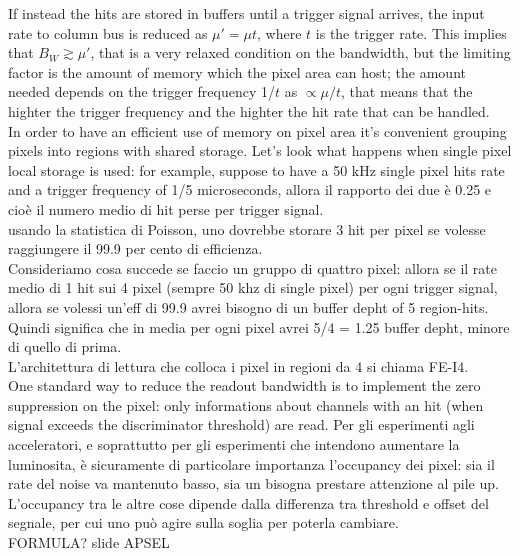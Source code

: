    If instead the hits are stored in buffers until a trigger signal arrives, the input rate
   to column bus is reduced as $\mu'=\mu t$, where $t$ is the trigger rate.
   This implies that $B_{W} \gtrsim \mu'$, that is a very relaxed condition on the
   bandwidth, but the limiting factor is the amount of memory  which the pixel area
   can host; the amount needed depends on the trigger frequency 1/$t$ as
   $\propto\mu/t$, that means that the highter the trigger frequency and the highter
   the hit rate that can be handled. \\
   In order to have an efficient use of memory on pixel area it's convenient
   grouping pixels into regions with shared storage. Let's look what happens when
   single pixel local storage is used: for example, suppose to have a 50 kHz single
   pixel hits rate and a trigger frequency of 1/5 microseconds, allora il rapporto dei due
   è 0.25 e cioè il numero medio di hit perse per trigger signal.\\
   usando la statistica di Poisson, uno dovrebbe storare 3 hit per pixel se volesse
   raggiungere il 99.9 per cento di efficienza.\\
   Consideriamo cosa succede se faccio un gruppo di quattro pixel: allora se il rate
   medio di 1 hit sui 4 pixel (sempre 50 khz di single pixel) per ogni trigger signal, allora se volessi un'eff di 99.9
   avrei bisogno di un buffer depht of 5 region-hits. Quindi significa che in media per
   ogni pixel avrei 5/4 = 1.25 buffer depht, minore di quello di prima.\\
   L'architettura di lettura che colloca i pixel in regioni da 4 si chiama FE-I4.\\

   One standard way to reduce the readout bandwidth is to implement the zero suppression
   on the pixel: only informations about channels with an hit (when signal exceeds
   the discriminator threshold) are read.
   Per gli esperimenti agli acceleratori, e soprattutto per gli esperimenti che
   intendono aumentare la luminosita, è sicuramente di particolare importanza
   l'occupancy dei pixel: sia il rate del noise va mantenuto basso, sia un
   bisogna prestare attenzione al pile up.
   L'occupancy tra le altre cose dipende dalla differenza tra threshold e offset del
   segnale, per cui uno può agire sulla soglia per poterla cambiare.\\
   FORMULA? slide APSEL\\



